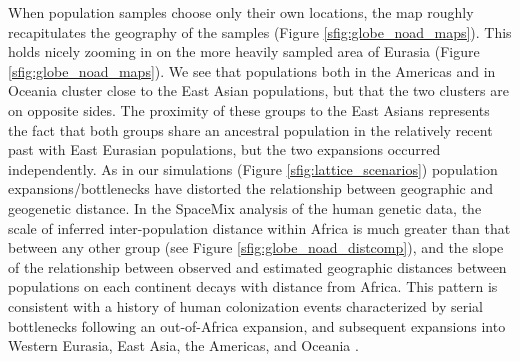 \documentclass[12pt]{article}
\begin{document}
When population samples choose only their own locations, the map roughly recapitulates the geography of the samples (Figure \ref{sfig:globe_noad_maps}). This holds nicely  zooming in on the more heavily sampled area of Eurasia (Figure \ref{sfig:globe_noad_maps}). We see that populations both in the Americas and in Oceania cluster close to the East Asian populations, but that the two clusters are on opposite sides.  The proximity of these groups to the East Asians represents the fact that both groups share an ancestral population in the relatively recent past with East Eurasian populations, but the two expansions occurred independently. As in our simulations (Figure \ref{sfig:lattice_scenarios}) population expansions/bottlenecks have distorted the relationship between geographic and geogenetic distance. In the SpaceMix analysis of the human genetic data, the scale of inferred inter-population distance within Africa is much greater than that between any other group (see Figure \ref{sfig:globe_noad_distcomp}), and the slope of the relationship between observed and estimated geographic distances between populations on each continent decays with distance from Africa.  This pattern is consistent with a history of human colonization events characterized by serial bottlenecks \citep{Harpending_Rogers_2000,prugnolle_geography_2005,Ramachandran:05} following an out-of-Africa expansion, and subsequent expansions into Western Eurasia, East Asia, the Americas, and Oceania \citep[but see][for a discussion of other models]{pickrell_reich:14}. 
\end{document}
